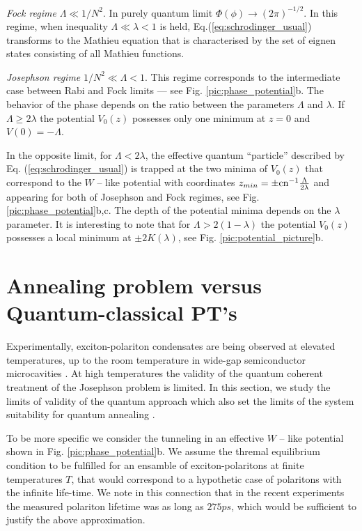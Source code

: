 \documentclass[aps, pre, preprint, groupedaddress, superscriptaddress, showkeys, showpacs] {revtex4-1}
\begin{document}
\textit{Fock regime} $\Lambda \ll 1/N^2$.
In purely quantum limit $\Phi(\phi) \to (2\pi)^{-1/2}$.
In this regime, when inequality $\Lambda \ll \lambda < 1$ is held, Eq.(\ref{eq:schrodinger_usual}) transforms to the Mathieu equation that is characterised by the set of eignen states consisting of all Mathieu functions.

\textit{Josephson regime} $1/N^2\ll\Lambda <1$.
This regime corresponds to the intermediate case between Rabi and Fock limits --- see Fig. \ref{pic:phase_potential}b.
The behavior of the phase depends on the ratio between the parameters $\Lambda$ and $\lambda$.
If $\Lambda \ge 2\lambda$ the potential $V_0(z)$ possesses only one minimum at $z = 0$ and $V(0) = -\Lambda$. 

In the opposite limit, for $\Lambda < 2 \lambda$, the effective quantum ``particle'' described by Eq. (\ref{eq:schrodinger_usual}) is trapped at the two minima of $V_0(z)$ that correspond to the $W$ -- like potential with coordinates $z_{min} = \pm \textrm{cn}^{-1}{\frac{\Lambda}{2 \lambda}}$ and appearing for both of Josephson and Fock regimes, see Fig. \ref{pic:phase_potential}b,c.  
The depth of the potential minima depends on the $\lambda$ parameter.
It is interesting to note that for $\Lambda > 2(1 - \lambda)$ the potential $V_0(z)$ possesses a local minimum at $\pm 2 K(\lambda)$, see Fig. \ref{pic:potential_picture}b.

\section{Annealing problem versus Quantum-classical PT's \label{sec:quantum_classical}}

Experimentally, exciton-polariton condensates are being observed at elevated temperatures, up to the room temperature in wide-gap semiconductor microcavities \cite{Sanvitto,Guillet}.
At high temperatures the validity of the quantum coherent treatment of the Josephson problem is limited.
In this section, we study the limits of validity of the quantum approach which also set the limits of the system suitability for quantum annealing \cite{Das}.

To be more specific we consider the tunneling in an effective $W$ -- like potential shown in Fig. \ref{pic:phase_potential}b. We assume the thremal equilibrium condition to be fulfilled for an ensamble of exciton-polaritons at finite temperatures $T$, that would correspond to a hypothetic case of polaritons with the infinite life-time.  We note in this connection that in the recent experiments \cite{Snoke_2017} the measured polariton lifetime was as long as $275ps$, which would be sufficient to justify the above approximation.
\end{document}
